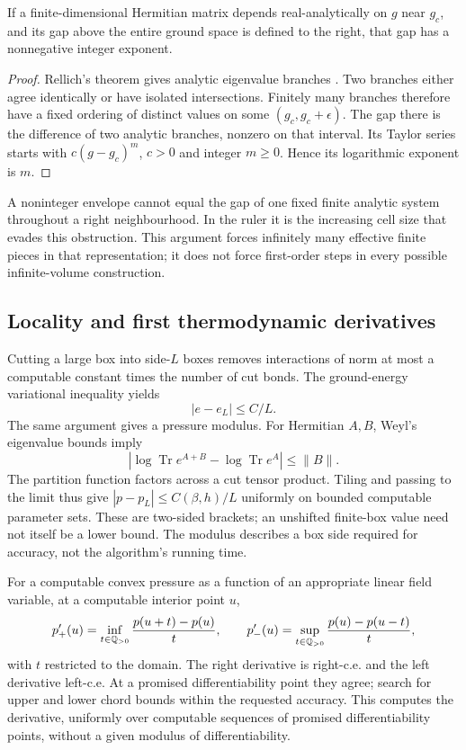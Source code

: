 \begin{proposition}\label{prop:rellich}
If a finite-dimensional Hermitian matrix depends real-analytically
on $g$ near $g_c$, and its gap above the entire ground space is
defined to the right, that gap has a nonnegative integer exponent.
\end{proposition}
\begin{proof}
Rellich's theorem gives analytic eigenvalue branches
\cite[Chapter~II, Section~6]{kato}. Two branches either agree
identically or have isolated intersections. Finitely many branches
therefore have a fixed ordering of distinct values on some
$(g_c,g_c+\epsilon)$. The gap there is the difference of two analytic
branches, nonzero on that interval. Its Taylor series starts with
$c(g-g_c)^m$, $c>0$ and integer $m\geq0$. Hence its logarithmic
exponent is $m$.
\end{proof}

A noninteger envelope cannot equal the gap of one fixed finite
analytic system throughout a right neighbourhood. In the ruler it
is the increasing cell size that evades this obstruction. This
argument forces infinitely many effective finite pieces in that
representation; it does not force first-order steps in every
possible infinite-volume construction.

\subsection{Locality and first thermodynamic derivatives}
Cutting a large box into side-$L$ boxes removes interactions of norm
at most a computable constant times the number of cut bonds. The
ground-energy variational inequality yields
\begin{equation}\label{eq:density-modulus}
 |e-e_L|\leq C/L.
\end{equation}
The same argument gives a pressure modulus. For Hermitian $A,B$,
Weyl's eigenvalue bounds imply
\[
 |\log\operatorname{Tr}e^{A+B}-\log\operatorname{Tr}e^A|
 \leq\|B\|.
\]
The partition function factors across a cut tensor product.
Tiling and passing to the limit thus give $|p-p_L|\leq C(\beta,h)/L$
uniformly on bounded computable parameter sets. These are two-sided
brackets; an unshifted finite-box value need not itself be a lower
bound. The modulus describes a box side required for accuracy,
not the algorithm's running time.

For a computable convex pressure as a function of an appropriate
linear field variable, at a computable interior point $u$,
\[
 p'_+(u)=\inf_{t\in\mathbb Q_{>0}}\frac{p(u+t)-p(u)}t,\qquad
 p'_-(u)=\sup_{t\in\mathbb Q_{>0}}\frac{p(u)-p(u-t)}t,
\]
with $t$ restricted to the domain. The right derivative is
right-c.e. and the left derivative left-c.e. At a promised
differentiability point they agree; search for upper and lower chord
bounds within the requested accuracy. This computes the derivative,
uniformly over computable sequences of promised differentiability
points, without a given modulus of differentiability.

